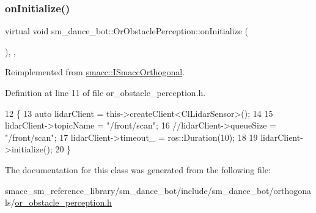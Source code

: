 \subsubsection{\texorpdfstring{on\+Initialize()}{onInitialize()}}
{\footnotesize\ttfamily virtual void sm\+\_\+dance\+\_\+bot\+::\+Or\+Obstacle\+Perception\+::on\+Initialize (\begin{DoxyParamCaption}{ }\end{DoxyParamCaption})\hspace{0.3cm}{\ttfamily [inline]}, {\ttfamily [override]}, {\ttfamily [virtual]}}



Reimplemented from \hyperlink{classsmacc_1_1ISmaccOrthogonal_a6bb31c620cb64dd7b8417f8705c79c7a}{smacc\+::\+I\+Smacc\+Orthogonal}.



Definition at line 11 of file or\+\_\+obstacle\+\_\+perception.\+h.


\begin{DoxyCode}
12     \{
13         \textcolor{keyword}{auto} lidarClient = this->createClient<ClLidarSensor>();
14 
15         lidarClient->topicName = \textcolor{stringliteral}{"/front/scan"};
16         \textcolor{comment}{//lidarClient->queueSize = "/front/scan";}
17         lidarClient->timeout\_ = ros::Duration(10);
18 
19         lidarClient->initialize();
20     \}
\end{DoxyCode}


The documentation for this class was generated from the following file\+:\begin{DoxyCompactItemize}
\item 
smacc\+\_\+sm\+\_\+reference\+\_\+library/sm\+\_\+dance\+\_\+bot/include/sm\+\_\+dance\+\_\+bot/orthogonals/\hyperlink{include_2sm__dance__bot_2orthogonals_2or__obstacle__perception_8h}{or\+\_\+obstacle\+\_\+perception.\+h}\end{DoxyCompactItemize}
